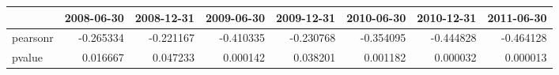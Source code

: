 \begin{tabular}{lrrrrrrr}
\toprule
{} &  2008-06-30 &  2008-12-31 &  2009-06-30 &  2009-12-31 &  2010-06-30 &  2010-12-31 &  2011-06-30 \\
\midrule
pearsonr &   -0.265334 &   -0.221167 &   -0.410335 &   -0.230768 &   -0.354095 &   -0.444828 &   -0.464128 \\
pvalue   &    0.016667 &    0.047233 &    0.000142 &    0.038201 &    0.001182 &    0.000032 &    0.000013 \\
\bottomrule
\end{tabular}

